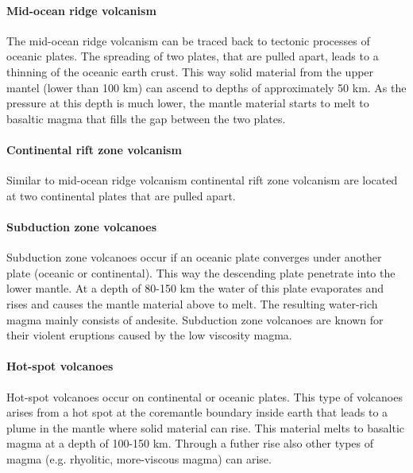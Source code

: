 \documentclass  [
  paper    = a4,
  BCOR     = 10mm,
  twoside,
  fontsize = 12pt,
  fleqn,
  toc      = bibnumbered,
  toc      = listofnumbered,
  numbers  = noendperiod,
  headings = normal,
  listof   = leveldown,
  version  = 3.03
]                                       {scrreprt}
\begin{document}
\paragraph{ Mid-ocean ridge volcanism}
The mid-ocean ridge volcanism can be traced back to tectonic processes of oceanic plates. The spreading of two plates, that are pulled apart, leads to a thinning of the oceanic earth crust. This way solid material from the upper mantel (lower than 100 km) can ascend to depths of approximately 50 km. As the pressure at this depth is much lower, the mantle material starts to melt to basaltic magma that fills the gap between the two plates.
\paragraph{ Continental rift zone volcanism}
Similar to mid-ocean ridge volcanism continental rift zone volcanism are located at two continental plates that are pulled apart.
\paragraph{ Subduction zone volcanoes}
Subduction zone volcanoes occur if an oceanic plate converges under another plate (oceanic or continental). This way the descending plate penetrate into the lower mantle. At a depth of 80-150 km the water of this plate evaporates and rises and causes the mantle material above to melt. The resulting water-rich magma mainly consists of andesite. Subduction zone volcanoes are known for their violent eruptions caused by the low viscosity magma.
\paragraph{ Hot-spot volcanoes} Hot-spot volcanoes occur on continental or oceanic plates. This type of volcanoes arises from a hot spot at the coremantle boundary inside earth that leads to a plume in the mantle where solid material can rise. This material melts to basaltic magma at a depth of 100-150 km. Through a futher rise also other types of magma (e.g. rhyolitic, more-viscous magma) can arise.
\end{document}
